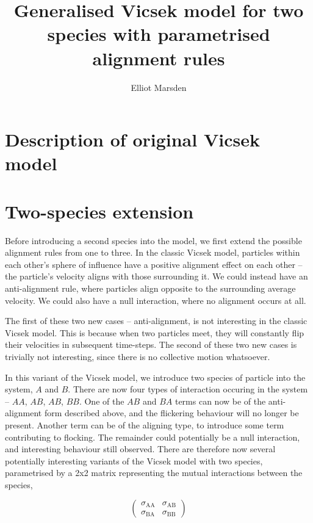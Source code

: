 \documentclass{article}
\begin{document}
\title{Generalised Vicsek model for two species with parametrised alignment rules}
\author{Elliot Marsden}
\maketitle

\section{Description of original Vicsek model}

\section{Two-species extension}

Before introducing a second species into the model, we first extend the possible alignment rules from one to three. In the classic Vicsek model, particles within each other's sphere of influence have a positive alignment effect on each other -- the particle's velocity aligns with those surrounding it. We could instead have an anti-alignment rule, where particles align opposite to the surrounding average velocity. We could also have a null interaction, where no alignment occurs at all. 

The first of these two new cases -- anti-alignment, is not interesting in the classic Vicsek model. This is because when two particles meet, they will constantly flip their velocities in subsequent time-steps. The second of these two new cases is trivially not interesting, since there is no collective motion whatsoever.

In this variant of the Vicsek model, we introduce two species of particle into the system, $A$ and $B$. There are now four types of interaction occuring in the system -- $AA$, $AB$, $AB$, $BB$. One of the $AB$ and $BA$ terms can now be of the anti-alignment form described above, and the flickering behaviour will no longer be present. Another term can be of the aligning type, to introduce some term contributing to flocking. The remainder could potentially be a null interaction, and interesting behaviour still observed. There are therefore now several potentially interesting variants of the Vicsek model with two species, parametrised by a 2x2 matrix representing the mutual interactions between the species,

\begin{equation}
  \begin{pmatrix}
    \sigma_\mathrm{AA} & \sigma_\mathrm{AB}\\
    \sigma_\mathrm{BA} & \sigma_\mathrm{BB}
  \end{pmatrix}  
\end{equation}
\end{document}
